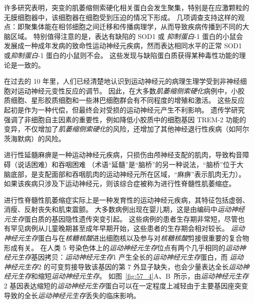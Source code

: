 许多研究表明，突变的肌萎缩侧索硬化相关蛋白会发生聚集，特别是在应激颗粒的无膜细胞器中，该细胞器在细胞受到压迫的情况下形成。
几项调查支持这样的观点：即聚集体能在相邻细胞之间迁移和传播病理学，从而导致疾病传播到不同的大脑区域。
特别值得注意的是，表达有缺陷的 SOD1 或 \textit{抑制蛋白}-1 蛋白的小鼠会发展成一种成年发病的致命性运动神经元疾病，然而表达相同水平的正常 SOD1 或\textit{抑制蛋白}-1 蛋白的小鼠则不会。
这些发现与缺陷蛋白质获得某种毒性功能的理论是一致的。


在过去的 10 年里，人们已经清楚地认识到运动神经元的病理生理学受到非神经细胞对运动神经元变性反应的调节。
因此，在大多数\textit{肌萎缩侧索硬化}病例中，小胶质细胞、星形胶质细胞和一些淋巴细胞群会有不同程度的增殖和激活。
这些反应起初是作为一种代偿，但最终会对受损的运动神经元产生不利影响。
遗传学研究强调了非细胞自主因素的重要性，例如降低小胶质中的细胞基因 TREM-2 功能的变异，不仅增加了\textit{肌萎缩侧索硬化}的风险，还增加了其他神经退行性疾病（如阿尔茨海默病）的风险。


进行性延髓麻痹是一种运动神经元疾病，只损伤由颅神经支配的肌肉，导致构音障碍（说话困难）和吞咽困难
（术语“延髓”是“脑桥”的另一种说法，“脑桥”位于大脑底部，是支配面部和吞咽肌肉的运动神经元所在区域，“麻痹”表示肌肉无力）。
如果该疾病只涉及下运动神经元，则该综合症被称为进行性脊髓性肌萎缩症。


进行性脊髓性肌萎缩症实际上是一种发育性的运动神经元疾病，其特征包括虚弱、消瘦、反射丧失和肌束震颤。
大多数病例出现在婴儿期，这是由编码中\textit{运动神经元生存}蛋白质的基因隐性遗传突变引起。
这些病例的患者生存期非常短，尽管也有罕见病例从儿童晚期甚至成年早期开始，这些患者的生存期会相对较长。
\textit{运动神经元生存}蛋白与在\textit{核糖核酸}进出细胞核以及参与对\textit{核糖核酸}剪接很重要的复合物形成有关。
在人类 5 号染色体上的\textit{运动神经元生存}位点有两个几乎相同的\textit{运动神经元生存}基因拷贝：\textit{运动神经元生存}1 产生全长的\textit{运动神经元生存}蛋白，而 \textit{运动神经元生存}2 的可变剪接导致该基因的第 7 外显子缺失，也会少量表达全长\textit{运动神经元生存}和缩短\textit{运动神经元生存}。
如图~\ref{fig:57_4}A、B~所示，由\textit{运动神经元生存}2 基因表达缩短的\textit{运动神经元生存}蛋白可以在一定程度上减轻由于主要基因座突变导致的全长\textit{运动神经元生存}丢失的临床影响。


